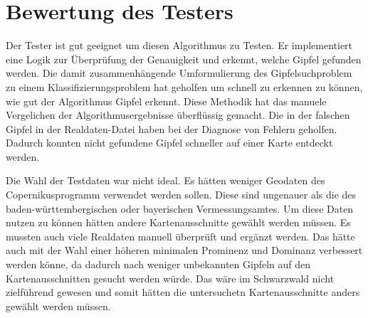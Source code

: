 \section{Bewertung des Testers}\label{sec:bewertung_des_testers}
Der Tester ist gut geeignet um diesen Algorithmus zu Testen. Er implementiert eine Logik zur Überprüfung der Genauigkeit und erkennt, welche Gipfel gefunden werden. Die damit zusammenhängende Umformulierung des Gipfelsuchproblem zu einem Klassifizierungsproblem hat geholfen um schnell zu erkennen zu können, wie gut der Algorithmus Gipfel erkennt. Diese Methodik hat das manuele Vergelichen der Algorithmusergebnisse überflüssig gemacht. Die in der falschen Gipfel in der Realdaten-Datei  haben bei der Diagnose von Fehlern geholfen. Dadurch konnten nicht gefundene Gipfel schneller auf einer Karte entdeckt werden. 

Die Wahl der Testdaten war nicht ideal. Es hätten weniger Geodaten des Copernikusprogramm verwendet werden sollen. Diese sind ungenauer als die des baden-württembergischen oder bayerischen Vermessungsamtes. Um diese Daten nutzen zu können hätten andere Kartenausschnitte gewählt werden müssen. Es mussten auch viele Realdaten manuell überprüft und ergänzt werden. Das hätte auch mit der Wahl einer höheren minimalen Prominenz und Dominanz verbessert werden könne, da dadurch nach weniger unbekannten Gipfeln auf den Kartenausschnitten gesucht werden würde. Das wäre im Schwarzwald nicht zielführend gewesen und somit hätten die untersuchetn Kartenausschnitte anders gewählt werden müssen. 